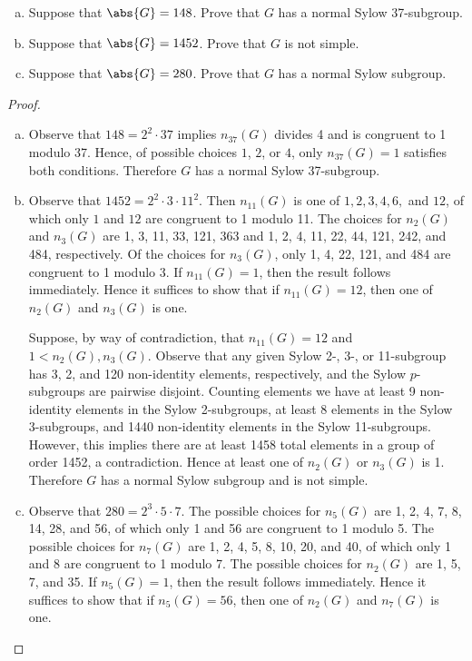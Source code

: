 \documentclass[10pt]{amsart}
\begin{document}
\begin{thm}
  \begin{enumerate}[(a)]
    \item
      Suppose that $\abs{G} = 148$.  Prove that $G$ has a normal Sylow 37-subgroup.
    \item
      Suppose that $\abs{G} = 1452$.  Prove that $G$ is not simple.
    \item
      Suppose that $\abs{G} = 280$.  Prove that $G$ has a normal Sylow subgroup.
  \end{enumerate}
  \begin{proof}
    \begin{enumerate}[(a)]
    \item
      Observe that $148 = 2^2\cdot37$ implies $n_{37}(G)$ divides 4 and is congruent to 1 modulo 37.
      Hence, of possible choices $1$, $2$, or $4$, only $n_{37}(G) = 1$ satisfies both conditions.
      Therefore $G$ has a normal Sylow 37-subgroup.
    \item
      Observe that $1452 = 2^2\cdot3\cdot11^2$.
      Then $n_{11}(G)$ is one of $1, 2,3,4,6,$ and $12$, of which only $1$ and $12$ are congruent to 1 modulo 11.
      The choices for $n_2(G)$ and $n_3(G)$ are 1, 3, 11, 33, 121, 363 and 1, 2, 4, 11, 22, 44, 121, 242, and 484, respectively.
      Of the choices for $n_3(G)$, only 1, 4, 22, 121, and 484 are congruent to 1 modulo 3.
      If $n_{11}(G) = 1$, then the result follows immediately.  Hence it suffices to show that if $n_{11}(G) = 12$, then one of $n_2(G)$ and $n_3(G)$ is one.

      Suppose, by way of contradiction, that $n_{11}(G) = 12$ and $1 < n_2(G), n_3(G)$.
      Observe that any given Sylow 2-, 3-, or 11-subgroup has 3, 2, and 120 non-identity elements, respectively, and the Sylow $p$-subgroups are pairwise disjoint.
      Counting elements we have at least 9 non-identity elements in the Sylow 2-subgroups, at least 8 elements in the Sylow 3-subgroups, and 1440 non-identity elements in the Sylow 11-subgroups.
      However, this implies there are at least 1458 total elements in a group of order 1452, a contradiction.
      Hence at least one of $n_2(G)$ or $n_3(G)$ is 1.
      Therefore $G$ has a normal Sylow subgroup and is not simple.
    \item
      Observe that $280 = 2^3\cdot5\cdot7$.
      The possible choices for $n_5(G)$ are 1, 2, 4, 7, 8, 14, 28, and 56, of which only 1 and 56 are congruent to 1 modulo 5.
      The possible choices for $n_7(G)$ are 1, 2, 4, 5, 8, 10, 20, and 40, of which only 1 and 8 are congruent to 1 modulo 7.
      The possible choices for $n_2(G)$ are 1, 5, 7, and 35.
      If $n_5(G) = 1$, then the result follows immediately.
      Hence it suffices to show that if $n_5(G) = 56$, then one of $n_2(G)$ and $n_7(G)$ is one.
      

\end{enumerate}
\end{proof}
\end{thm}
\end{document}
